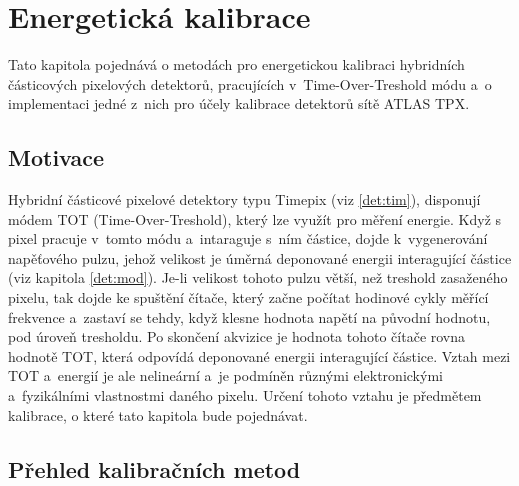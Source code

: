 

\chapter{Energetická kalibrace}\label{calib}
Tato kapitola pojednává o metodách pro energetickou kalibraci hybridních částicových pixelových detektorů, pracujících v~Time-Over-Treshold módu a~o implementaci jedné z~nich pro účely kalibrace detektorů sítě ATLAS TPX.

\section{Motivace}
Hybridní částicové pixelové detektory typu Timepix (viz \ref{det:tim}), disponují módem TOT (Time-Over-Treshold), který lze využít pro měření energie. 
Když s pixel pracuje v~tomto módu a~intaraguje s~ním částice, dojde k~vygenerování napěťového pulzu, jehož velikost je úměrná deponované energii interagující částice (viz kapitola \ref{det:mod}).
Je-li velikost tohoto pulzu větší, než treshold zasaženého pixelu, tak dojde ke spuštění čítače, který začne počítat hodinové cykly měřící frekvence a~zastaví se tehdy, když klesne hodnota napětí na původní hodnotu, pod úroveň tresholdu. Po skončení akvizice je hodnota tohoto čítače rovna hodnotě TOT, která odpovídá deponované energii interagující částice. Vztah mezi TOT a~energií je ale nelineární a~je podmíněn různými elektronickými a~fyzikálními vlastnostmi daného pixelu. Určení tohoto vztahu je předmětem kalibrace, o které tato kapitola bude pojednávat.

\section{Přehled kalibračních metod}

